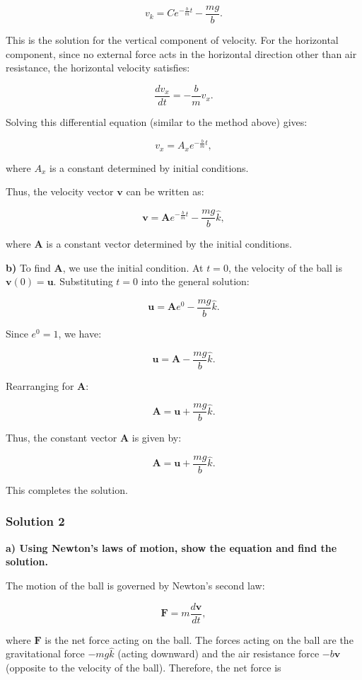 \documentclass{article}
\begin{document}
\[
v_k = C e^{-\frac{b}{m}t} - \frac{mg}{b}.
\]

This is the solution for the vertical component of velocity. For the horizontal component, since no external force acts in the horizontal direction other than air resistance, the horizontal velocity satisfies:

\[
\frac{d v_x}{dt} = -\frac{b}{m} v_x.
\]

Solving this differential equation (similar to the method above) gives:

\[
v_x = A_x e^{-\frac{b}{m}t},
\]

where $A_x$ is a constant determined by initial conditions.

Thus, the velocity vector $\mathbf{v}$ can be written as:

\[
\mathbf{v} = \mathbf{A} e^{-\frac{b}{m}t} - \frac{mg}{b} \hat{k},
\]

where $\mathbf{A}$ is a constant vector determined by the initial conditions.

\textbf{b)} To find $\mathbf{A}$, we use the initial condition. At $t = 0$, the velocity of the ball is $\mathbf{v}(0) = \mathbf{u}$. Substituting $t = 0$ into the general solution:

\[
\mathbf{u} = \mathbf{A} e^{0} - \frac{mg}{b} \hat{k}.
\]

Since $e^{0} = 1$, we have:

\[
\mathbf{u} = \mathbf{A} - \frac{mg}{b} \hat{k}.
\]

Rearranging for $\mathbf{A}$:

\[
\mathbf{A} = \mathbf{u} + \frac{mg}{b} \hat{k}.
\]

Thus, the constant vector $\mathbf{A}$ is given by:

\[
\mathbf{A} = \mathbf{u} + \frac{mg}{b} \hat{k}.
\]

This completes the solution.

\subsubsection{Solution 2}
\textbf{a) Using Newton's laws of motion, show the equation and find the solution.}

The motion of the ball is governed by Newton's second law:

\[
\mathbf{F} = m \frac{d \mathbf{v}}{dt},
\]

where $\mathbf{F}$ is the net force acting on the ball. The forces acting on the ball are the gravitational force $-mg\hat{k}$ (acting downward) and the air resistance force $-b \mathbf{v}$ (opposite to the velocity of the ball). Therefore, the net force is
\end{document}
